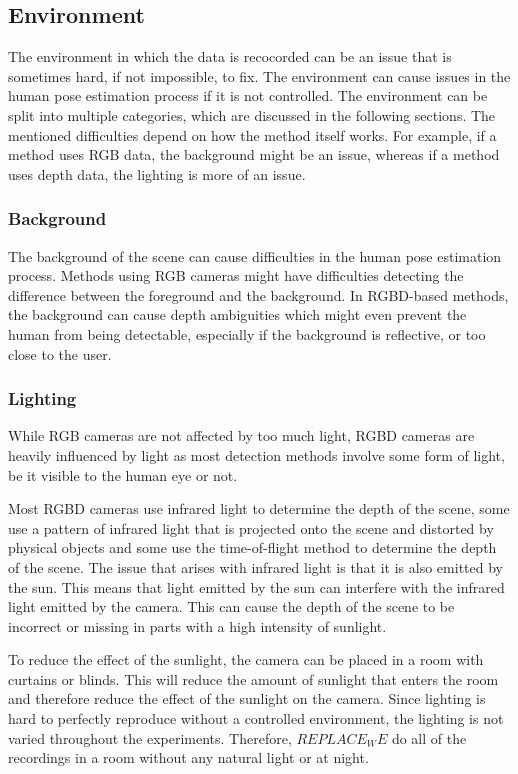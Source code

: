 \subsection{Environment}

The environment in which the data is recocorded can be an issue that is sometimes hard, if not impossible, to fix. The environment can cause issues in the human pose estimation process if it is not controlled. The environment can be split into multiple categories, which are discussed in the following sections. The mentioned difficulties depend on how the method itself works. For example, if a method uses RGB data, the background might be an issue, whereas if a method uses depth data, the lighting is more of an issue.

\subsubsection{Background}

The background of the scene can cause difficulties in the human pose estimation process. Methods using RGB cameras might have difficulties detecting the difference between the foreground and the background. In RGBD-based methods, the background can cause depth ambiguities which might even prevent the human from being detectable, especially if the background is reflective, or too close to the user.

\subsubsection{Lighting}

While RGB cameras are not affected by too much light, RGBD cameras are heavily influenced by light as most detection methods involve some form of light, be it visible to the human eye or not.

Most RGBD cameras use infrared light to determine the depth of the scene, some use a pattern of infrared light that is projected onto the scene and distorted by physical objects and some use the time-of-flight method to determine the depth of the scene. The issue that arises with infrared light is that it is also emitted by the sun. This means that light emitted by the sun can interfere with the infrared light emitted by the camera. This can cause the depth of the scene to be incorrect or missing in parts with a high intensity of sunlight.

To reduce the effect of the sunlight, the camera can be placed in a room with curtains or blinds. This will reduce the amount of sunlight that enters the room and therefore reduce the effect of the sunlight on the camera. Since lighting is hard to perfectly reproduce without a controlled environment, the lighting is not varied throughout the experiments. Therefore, $REPLACE_WE$ do all of the recordings in a room without any natural light or at night.

